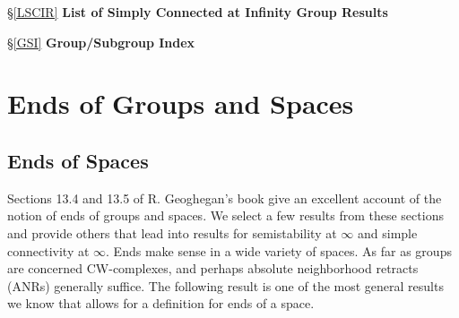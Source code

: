 \documentclass[12pt]{article}
\begin{document}
\noindent\hspace{.6 in} \S \ref{LSCIR} {\bf List of Simply Connected at Infinity Group Results}

\noindent\hspace{.6 in} \S \ref{GSI} {\bf Group/Subgroup Index}

\newpage
\begin{abstract}\label{abst}
This $2^{nd}$-edition article is intended to be an up-to-date archive of the current state of the questions: Which finitely generated groups $G$: have semistable fundamental group at infinity; are simply connected at infinity; are such that $H^2(G,\mathbb ZG)$ is free abelian or trivial. The idea is not to reprove these results, but to provide a historical record of the progress on these questions and provide a  list of the most general results. We also prove or cite all of the results that make up the basic theory. The first Chapter is devoted to ends of groups and spaces, and the second to semistability at infinity, simple connectivity at infinity and second cohomology of groups. Definitions, basic facts and lists of general results are given in each Chapter. A number of results  proven here are new and a number of authors have contributed results. We end with an Index for simply connected at infinity groups and an Index of Groups and Subgroups which is intended to help a reader quickly locate results about certain types of groups/subgroups. The main updates from the first edition is section 2.4.5 on mapping class groups and the addition of the simply connected at infinity index.
\end{abstract}
\section{Ends of Groups and Spaces}\label{Ends}
\subsection{Ends of Spaces} \label{Esp} 

Sections 13.4 and 13.5 of  R. Geoghegan's book \cite{G} give an excellent account of the notion of ends of groups and spaces. We select a few results from these sections and provide others that lead into results for semistability at $\infty$ and simple connectivity at $\infty$. Ends make sense in a wide variety of spaces. As far as groups are concerned CW-complexes, and perhaps absolute neighborhood retracts (ANRs) generally suffice. The following result is one of the most general results we know that allows for a definition for ends of a space. 
\end{document}
